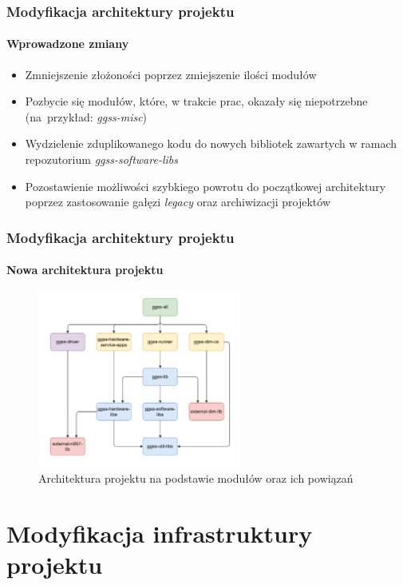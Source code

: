 \documentclass[10pt]{beamer}
\begin{document}
\begin{frame}
    \frametitle{Modyfikacja architektury projektu}
    \framesubtitle{Wprowadzone zmiany}
    \begin{itemize}
        \item Zmniejszenie złożoności poprzez zmiejszenie ilości modułów
        \item Pozbycie się modułów, które, w trakcie prac, okazały się niepotrzebne (na~przykład: \emph{ggss-misc})
        \item Wydzielenie zduplikowanego kodu do nowych bibliotek zawartych w ramach repozutorium \emph{ggss-software-libs}
        \item Pozostawienie możliwości szybkiego powrotu do początkowej architektury poprzez zastosowanie gałęzi \emph{legacy} oraz archiwizacji projektów
    \end{itemize}
\end{frame}

\begin{frame}
\frametitle{Modyfikacja architektury projektu}
\framesubtitle{Nowa architektura projektu}
\begin{figure}
    \includegraphics[width=0.6\textwidth]{static/new_architecture.pdf}
    \caption{Architektura projektu na podstawie modułów oraz ich powiązań}
\end{figure}
\end{frame}


\section{Modyfikacja infrastruktury projektu}
\end{document}
